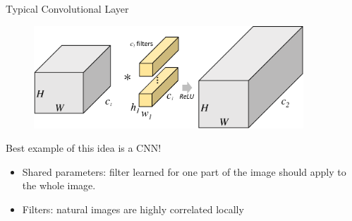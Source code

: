 \documentclass[t,xcolor=dvipsnames]{beamer}
\begin{document}
\begin{frame}{Typical Convolutional Layer}
\begin{figure}
   \includegraphics[width=0.9\textwidth, page=1]{../Figs/PDF/groupfig}
\end{figure}
    Best example of this idea is a CNN!
    \begin{itemize}
        \item Shared parameters: filter learned for one part of the image should apply to the whole image.
        \item Filters: natural images are highly correlated locally
    \end{itemize}

\end{frame}

\end{document}
